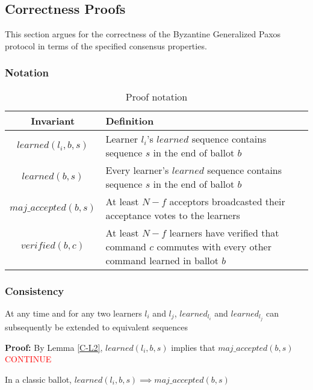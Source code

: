 \subsection{Correctness Proofs}

This section argues for the correctness of the Byzantine Generalized Paxos protocol in terms of the specified consensus properties.\par

\subsubsection{Notation}
\begin{table}[h!]
	\renewcommand{\arraystretch}{1.5}
	\centering
	\begin{tabularx}{\linewidth}{ |c|X|}
		\hline
		Invariant & Definition \\
		\hline
		$learned(l_i,b,s)$ & Learner $l_i$'s $learned$ sequence contains sequence $s$ in the end of ballot $b$  \\
		\hline
		$learned(b,s)$ & Every learner's $learned$ sequence contains sequence $s$ in the end of ballot $b$\\
		\hline
		$maj\_accepted(b,s)$ & At least $N-f$ acceptors broadcasted their acceptance votes to the learners\\
		\hline
		$verified(b,c)$ & At least $N-f$ learners have verified that command $c$ commutes with every other command learned in ballot $b$\\
		\hline
	\end{tabularx} 
	\caption{Proof notation} 
	\label{table:1}
\end{table}

\subsubsection{Consistency}
\begin{theorem}
At any time and for any two learners $l_i$ and $l_j$, $learned_{l_i}$ and $learned_{l_j}$ can subsequently be extended to equivalent sequences 
\end{theorem} \label{C-T1}
\textbf{Proof:} By Lemma \ref{C-L2}, $learned(l_i,b,s)$ implies that $maj\_accepted(b,s)$ \textcolor{red}{CONTINUE}
\par
\begin{lemma}
In a classic ballot, $learned(l_i,b,s) \implies maj\_accepted(b,s)$ \label{C-L2} \par
\end{lemma} 


